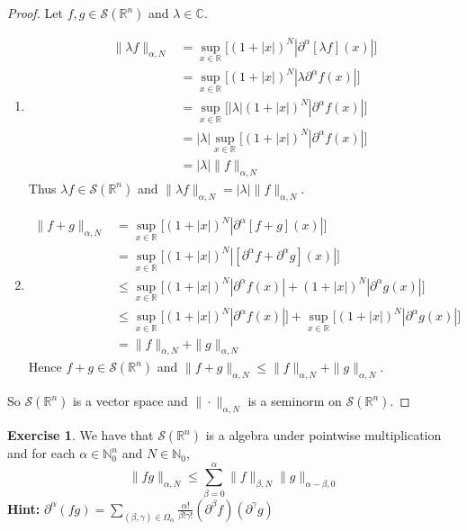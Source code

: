 \documentclass[12pt]{amsart}
\theoremstyle{definition}
\newtheorem{ex}[definition]{Exercise}
\newcommand{\p}{\partial}
\newcommand{\al}{\alpha}
\newcommand{\be}{\beta}
\newcommand{\gam}{\gamma}
\newcommand{\lam}{\lambda}
\newcommand{\Om}{\Omega}
\newcommand{\C}{\mathbb{C}}
\newcommand{\N}{\mathbb{N}}
\newcommand{\R}{\mathbb{R}}
\newcommand{\MS}{\mathcal{S}}
\begin{document}
	\begin{proof} Let $f, g \in \MS(\R^n)$ and $\lam \in \C$.
		\begin{enumerate}
			\item 
			\begin{align*}
				\|\lam f\|_{\al, N}
				& = \sup_{x \in \R} \bigg[  (1 + |x|)^N |\p^{\al}[\lam f] (x)| \bigg] \\
				& = \sup_{x \in \R} \bigg[  (1 + |x|)^N |\lam \p^{\al}f (x)| \bigg] \\
				& = \sup_{x \in \R} \bigg[  |\lam| (1 + |x|)^N | \p^{\al}f (x)| \bigg] \\
				& = |\lam| \sup_{x \in \R} \bigg[ (1 + |x|)^N | \p^{\al}f (x)| \bigg] \\
				& = |\lam | \|f\|_{\al, N}
			\end{align*}
			Thus $\lam f \in \MS(\R^n)$ and $\|\lam f\|_{\al, N} = |\lam | \|f\|_{\al, N}$.
		\item \begin{align*}
			\|f  +  g\|_{\al, N} 
			& = \sup_{x \in \R} \bigg[  (1 + |x|)^N |\p^{\al}[f + g] (x)| \bigg] \\
			& = \sup_{x \in \R} \bigg[  (1 + |x|)^N |[\p^{\al} f  + \p^{\al} g] (x)| \bigg] \\
			& \leq \sup_{x \in \R} \bigg[  (1 + |x|)^N |\p^{\al} f (x)|  +  (1 + |x|)^N |\p^{\al} g (x)| \bigg] \\
			& \leq \sup_{x \in \R} \bigg[  (1 + |x|)^N |\p^{\al} f (x)| \bigg]   + \sup_{x \in \R} \bigg[ (1 + |x|)^N |\p^{\al} g (x)| \bigg] \\
			& = \|f\|_{\al, N} + \|g\|_{\al, N} 
		\end{align*}
	 	Hence $f + g \in \MS(\R^n)$ and $\|f + g\|_{\al, N} \leq \|f\|_{\al, N} + \|g\|_{\al, N}$.
		\end{enumerate}
		So $\MS(\R^n)$ is a vector space and $\| \cdot \|_{\al, N}$ is a seminorm on $\MS(\R^n)$.
	\end{proof}

	\begin{ex}
		We have that $\MS(\R^n)$ is a algebra under pointwise multiplication and for each $\al \in \N_0^n$ and $N \in  \N_0$, 
		$$\|fg\|_{\al, N} \leq \sum\limits_{\be=0}^\al  \|f\|_{\be, N} \|g\|_{\al - \be, 0}$$
		\textbf{Hint:} $\p^{\al}(fg) = \sum\limits_{(\be, \gam) \in \Om_{\al}} \frac{\al!}{\be! \gam!}(\p^{\be}f) (\p^{\gam}g)$
	\end{ex}
\end{document}
